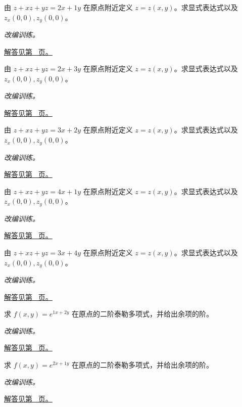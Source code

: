 \documentclass[UTF8,12pt,a4paper,fontset=fandol]{ctexart}
\begin{document}
\begin{example}[隐函数的一阶偏导]\label{ex:c33q14}
由 $z+xz+yz=2x+1y$ 在原点附近定义 $z=z(x,y)$。求显式表达式以及 $z_x(0,0),z_y(0,0)$。
\par\textit{改编训练。}\par\hyperref[ans:c33q14]{解答见第~\pageref{ans:c33q14} 页。}
\end{example}
\begin{example}[隐函数的一阶偏导]\label{ex:c33q15}
由 $z+xz+yz=2x+3y$ 在原点附近定义 $z=z(x,y)$。求显式表达式以及 $z_x(0,0),z_y(0,0)$。
\par\textit{改编训练。}\par\hyperref[ans:c33q15]{解答见第~\pageref{ans:c33q15} 页。}
\end{example}
\begin{example}[隐函数的一阶偏导]\label{ex:c33q16}
由 $z+xz+yz=3x+2y$ 在原点附近定义 $z=z(x,y)$。求显式表达式以及 $z_x(0,0),z_y(0,0)$。
\par\textit{改编训练。}\par\hyperref[ans:c33q16]{解答见第~\pageref{ans:c33q16} 页。}
\end{example}
\begin{example}[隐函数的一阶偏导]\label{ex:c33q17}
由 $z+xz+yz=4x+1y$ 在原点附近定义 $z=z(x,y)$。求显式表达式以及 $z_x(0,0),z_y(0,0)$。
\par\textit{改编训练。}\par\hyperref[ans:c33q17]{解答见第~\pageref{ans:c33q17} 页。}
\end{example}
\begin{example}[隐函数的一阶偏导]\label{ex:c33q18}
由 $z+xz+yz=3x+4y$ 在原点附近定义 $z=z(x,y)$。求显式表达式以及 $z_x(0,0),z_y(0,0)$。
\par\textit{改编训练。}\par\hyperref[ans:c33q18]{解答见第~\pageref{ans:c33q18} 页。}
\end{example}
\begin{example}[二元函数的二阶泰勒式]\label{ex:c33q19}
求 $f(x,y)=e^{1x+2y}$ 在原点的二阶泰勒多项式，并给出余项的阶。
\par\textit{改编训练。}\par\hyperref[ans:c33q19]{解答见第~\pageref{ans:c33q19} 页。}
\end{example}
\begin{example}[二元函数的二阶泰勒式]\label{ex:c33q20}
求 $f(x,y)=e^{2x+1y}$ 在原点的二阶泰勒多项式，并给出余项的阶。
\par\textit{改编训练。}\par\hyperref[ans:c33q20]{解答见第~\pageref{ans:c33q20} 页。}
\end{example}
\end{document}

